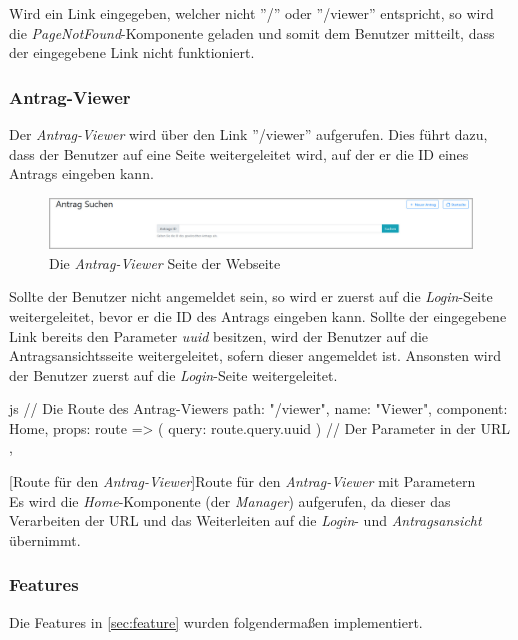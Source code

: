 Wird ein Link eingegeben, welcher nicht ''/'' oder ''/viewer'' entspricht, so wird die \textit{PageNotFound}-Komponente geladen und somit dem Benutzer mitteilt, dass der eingegebene Link nicht funktioniert.
\subsubsection{Antrag-Viewer}
\label{sec:antrag_viewer}
Der \textit{Antrag-Viewer} wird über den Link ''/viewer'' aufgerufen. Dies führt dazu, dass der Benutzer auf eine Seite weitergeleitet wird, auf der er die ID eines Antrags eingeben kann.
\begin{figure}[H]
	\centering
	\includegraphics[width=1\linewidth]{images/rfoster_implementierung/antrag_viewer}
	\caption[Webseite \textit{Antrag-Viewer}]{Die \textit{Antrag-Viewer} Seite der Webseite}
	\label{fig:antragviewer}
\end{figure}

Sollte der Benutzer nicht angemeldet sein, so wird er zuerst auf die \textit{Login}-Seite weitergeleitet, bevor er die ID des Antrags eingeben kann. Sollte der eingegebene Link bereits den Parameter \textit{uuid} besitzen, wird der Benutzer auf die Antragsansichtsseite weitergeleitet, sofern dieser angemeldet ist. Ansonsten wird der Benutzer zuerst auf die \textit{Login}-Seite weitergeleitet.
\begin{code}{js}
	{
		// Die Route des Antrag-Viewers
		path: "/viewer",
		name: "Viewer",
		component: Home,
		props: route => ({ query: route.query.uuid }) // Der Parameter in der URL
	},
\end{code}
[Route für den \textit{Antrag-Viewer}]{Route für den \textit{Antrag-Viewer} mit Parametern}~\\
Es wird die \textit{Home}-Komponente (der \textit{Manager}) aufgerufen, da dieser das Verarbeiten der URL und das Weiterleiten auf die \textit{Login}- und \textit{Antragsansicht} übernimmt.
\newpage
\subsubsection{Features}
Die Features in \autoref{sec:feature} wurden folgendermaßen implementiert.

